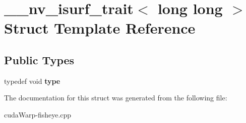 \hypertarget{struct____nv__isurf__trait_3_01long_01long_01_4}{}\section{\+\_\+\+\_\+nv\+\_\+isurf\+\_\+trait$<$ long long $>$ Struct Template Reference}
\label{struct____nv__isurf__trait_3_01long_01long_01_4}
\subsection*{Public Types}
\begin{DoxyCompactItemize}
\item 
typedef void {\bfseries type}\hypertarget{struct____nv__isurf__trait_3_01long_01long_01_4_a47962dbed8db460edeb0f70697f23a8a}{}\label{struct____nv__isurf__trait_3_01long_01long_01_4_a47962dbed8db460edeb0f70697f23a8a}

\end{DoxyCompactItemize}


The documentation for this struct was generated from the following file\+:\begin{DoxyCompactItemize}
\item 
cuda\+Warp-\/fisheye.\+cpp\end{DoxyCompactItemize}
